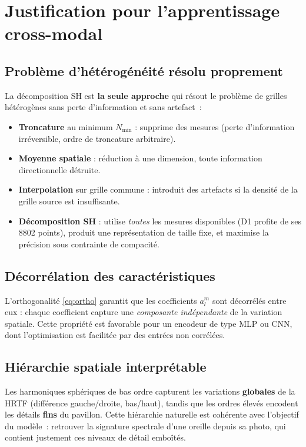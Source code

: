 \documentclass[12pt, a4paper]{article}
\begin{document}
\section{Justification pour l'apprentissage cross-modal}

\subsection{Problème d'hétérogénéité résolu proprement}

La décomposition SH est \textbf{la seule approche} qui résout le problème de
grilles hétérogènes sans perte d'information et sans artefact~:

\begin{itemize}
    \item \textbf{Troncature} au minimum $N_\mathrm{min}$ : supprime des mesures
    (perte d'information irréversible, ordre de troncature arbitraire).
    \item \textbf{Moyenne spatiale} : réduction à une dimension, toute information
    directionnelle détruite.
    \item \textbf{Interpolation} sur grille commune : introduit des artefacts si
    la densité de la grille source est insuffisante.
    \item \textbf{Décomposition SH} : utilise \emph{toutes} les mesures disponibles
    (D1 profite de ses 8802 points), produit une représentation de taille fixe,
    et maximise la précision sous contrainte de compacité.
\end{itemize}

\subsection{Décorrélation des caractéristiques}

L'orthogonalité \eqref{eq:ortho} garantit que les coefficients
$a_l^m$ sont décorrélés entre eux : chaque coefficient capture une
\emph{composante indépendante} de la variation spatiale. Cette propriété est
favorable pour un encodeur de type MLP ou CNN, dont l'optimisation est facilitée
par des entrées non corrélées.

\subsection{Hiérarchie spatiale interprétable}

Les harmoniques sphériques de bas ordre capturent les variations \textbf{globales}
de la HRTF (différence gauche/droite, bas/haut), tandis que les ordres élevés
encodent les détails \textbf{fins} du pavillon. Cette hiérarchie naturelle est
cohérente avec l'objectif du modèle~: retrouver la signature spectrale d'une oreille
depuis sa photo, qui contient justement ces niveaux de détail emboîtés.
\end{document}
